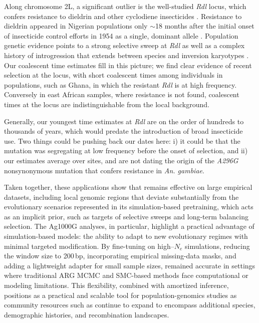 \documentclass[9pt,twocolumn,twoside]{pnas-new}
\begin{document}
Along chromosome 2L, a significant outlier is the well-studied \emph{Rdl} locus,
which confers resistance to dieldrin and other cyclodiene insecticides \cite{ffrench1993point,thompson1993conservation,du2005independent}.
Resistance to dieldrin appeared in Nigerian populations only ${\sim}$18 months 
after the initial onset of insecticide control efforts in 1954 \cite{elliott1956insecticide}
as a single, dominant allele \cite{davidson1962case}.
Population genetic evidence points to a strong selective sweep at \emph{Rdl}
as well as a complex history of introgression that extends between species and inversion karyotypes \cite{grau2020evolution}.
Our coalescent time estimates fill in this picture; 
we find clear evidence of recent selection at the locus, with 
short coalescent times among individuals in populations,
such as Ghana, in which the resistant \emph{Rdl} is at high frequency.
Conversely in east African samples, where resistance is not found, 
coalescent times at the locus are indistinguishable from the local background.

Generally, our youngest time estimates at \emph{Rdl} are on the order of hundreds to thousands of years, 
which would predate the introduction of broad insecticide use. 
Two things could be pushing back our dates here: i) it could
be that the mutation was segregating at low frequency before the onset of
selection, and ii) our estimates average over sites, and are not dating 
the origin of the \emph{A296G} nonsynonymous mutation that confers 
resistance in \emph{An. gambiae}.

Taken together, these applications show that \cxtkit remains effective on large empirical datasets, 
including local genomic regions that deviate substantially from the evolutionary scenarios represented in its simulation-based pretraining, which acts as an implicit prior, 
such as targets of selective sweeps and long-term balancing selection.
The Ag1000G analyses, in particular, highlight a practical advantage of simulation-based models: the ability to adapt to new evolutionary regimes with minimal targeted modification.
By fine-tuning on high--$N_e$ simulations, reducing the window size to 200\,bp, incorporating empirical missing-data masks, and adding a lightweight adapter for small sample sizes, \cxtkit remained accurate in settings where traditional ARG MCMC and SMC-based methods face computational or modeling limitations.
This flexibility, combined with amortized inference, positions \cxtkit as a practical and scalable tool for population-genomics studies as community resources such as \stdpopsim continue to expand to encompass additional species, demographic histories, and recombination landscapes.
\end{document}
